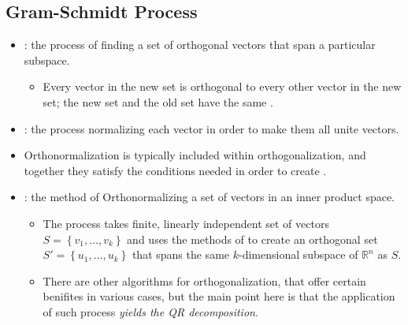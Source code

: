 \begin{itemize}
  \subsection{Gram-Schmidt Process}\label{Gram-Schmidt Process}
  \begin{itemize}
    \item {}: the process of finding a set of orthogonal vectors that span a particular subspace. 
    \begin{itemize}
      \item Every vector in the new set is orthogonal to every other vector in the new set; the new set and the old set have the same \hyperref[Span]{}.
    \end{itemize}
    \item {}: the process normalizing each vector in order to make them all unite vectors.
    \item Orthonormalization is typically included within orthogonalization, and together they satisfy the conditions needed in order to create \hyperref[Orthogonal Matrices]{}.
    \item {}: the method of Orthonormalizing a set of vectors in an inner product space.
      \begin{itemize}
        \item The process takes finite, linearly independent set of vectors \(S = \left\{v_1,\ldots,v_k \right\} \) and uses the methods of \hyperref[Finding Projections]{} to create an orthogonal set \(S' = \left\{u_1,\ldots,u_k \right\} \) that spans the same \(k\)-dimensional subspace of \(\mathbb{R}^n\) as \(S\). 
        \item There are other algorithms for orthogonalization, that offer certain benifites in various cases, but the main point here is that the application of such process \emph{yields the QR decomposition}.
      \end{itemize}
  \end{itemize}


\end{itemize}
